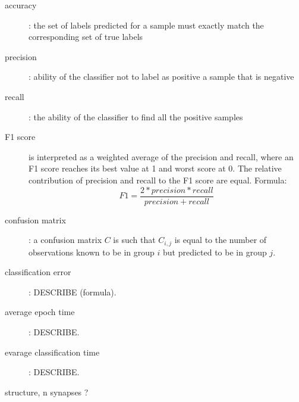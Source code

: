 \begin{description}
\item[accuracy] : the set of labels predicted for a sample must exactly match the corresponding set of true labels
\item[precision] : ability of the classifier not to label as positive a sample that is negative
\item[recall] : the ability of the classifier to find all the positive samples
\item[F1 score] is interpreted as a weighted average of the precision and recall, where an F1 score reaches its best value at 1 and worst score at 0. The relative contribution of precision and recall to the F1 score are equal. Formula:
\begin{equation} \label{eq:f1_score}
F1 = \frac{2 * precision * recall}{precision + recall}
\end{equation}
\item[confusion matrix] : a confusion matrix $ C $ is such that $ C_{i, j} $ is equal to the number of observations known to be in group $ i $ but predicted to be in group $ j $.
\item[classification error] : DESCRIBE (formula).
\item[average epoch time] : DESCRIBE.
\item[evarage classification time] : DESCRIBE.
\end{description}

structure, n synapses ?